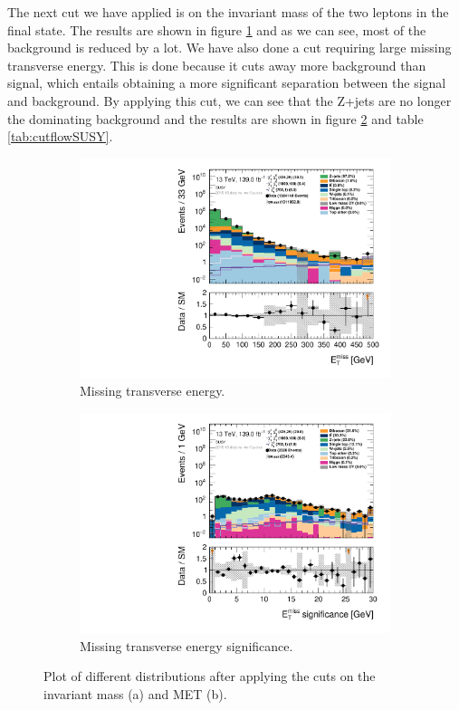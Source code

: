 The next cut we have applied is on the invariant mass of the two leptons in the final state. The results are shown in figure \ref{fig:metSUSY} and as we can see, most of the background is reduced by a lot. We have also done a cut requiring large missing transverse energy. This is done because it cuts away more background than signal, which entails obtaining a more significant separation between the signal and background. By applying this cut, we can see that the Z+jets are no longer the dominating background and the results are shown in figure \ref{fig:metSignSUSY} and table \ref{tab:cutflowSUSY}. 

\begin{figure}[H]
    \centering
    \begin{subfigure}[t!]{0.49\textwidth}
        \includegraphics[width=\textwidth]{Figures/SUSYcuts/hist1d_met_Et_SUSY.pdf}
    \caption{Missing transverse energy.}
    \label{fig:metSUSY}
    \end{subfigure}
    \begin{subfigure}[t!]{0.49\textwidth}
        \includegraphics[width=\textwidth]{Figures/SUSYcuts/hist1d_met_Sign_SUSY.pdf}
    \caption{Missing transverse energy significance.}
    \label{fig:metSignSUSY}
    \end{subfigure}
    \caption{Plot of different distributions after applying the cuts on the invariant mass (a) and MET (b).}
    \label{fig:stepsSUSY2}
\end{figure}


